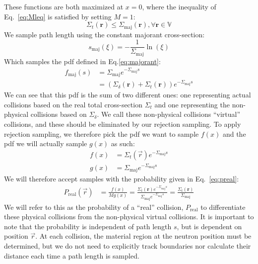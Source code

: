 These functions are both maximized at $x=0$, where the inequality of
Eq.~\eqref{eq:Mleq} is satisfied by setting $M=1$:
\begin{equation}
  \label{eq:cseq}
  \Sigma_t(\mathbf{r}) \leq \Sigma_\mathrm{maj}(\mathbf{r}), \forall
  \mathbf{r} \in \mathbb{V}
\end{equation}
We sample path length using the constant majorant
cross-section:
\begin{equation}
  \label{eq:majorantsample}
  s_\mathrm{maj}(\xi) = -\frac{1}{\Sigma_\mathrm{maj}}\ln(\xi)
\end{equation}
Which samples the \gls{pdf} defined in Eq.\eqref{eq:majorant}:
\begin{align*}
    f_\mathrm{maj}(s) &= \Sigma_\mathrm{maj}e^{-\Sigma_\mathrm{maj}s} \\
  & = (\Sigma_\delta(\mathbf{r}) +
    \Sigma_t(\mathbf{r}))e^{-\Sigma_\mathrm{maj}s}
\end{align*}
We can see that this \gls{pdf} is the sum of two different ones: one
representing actual collisions based on the real total cross-section
$\Sigma_t$ and one representing the non-physical collisions based on
$\Sigma_\delta$. We call these non-physical collisions ``virtual''
collisions, and these should be eliminated by our rejection
sampling. To apply rejection sampling, we therefore pick the \gls{pdf}
we want to sample $f(x)$ and the \gls{pdf} we will actually sample
$g(x)$ as such:
\begin{align*}
  f(x) &= \Sigma_t(\vec{r})e^{-\Sigma_\mathrm{maj}s} \\
  g(x) &= \Sigma_\mathrm{maj}e^{-\Sigma_\mathrm{maj}s}
\end{align*}
We will therefore accept samples with the probability given
in Eq.~\eqref{eq:preal}:
\begin{align}
  \label{eq:prealfinal}
  P_{\mathrm{real}}(\vec{r}) &= \frac{f(x)}{Mg(x)} =
      \frac{\Sigma_t(\mathbf{r})e^{-\Sigma_\mathrm{maj}s}}{\Sigma_\mathrm{maj}e^{-\Sigma_\mathrm{maj}s}}
  = \frac{\Sigma_t(\mathbf{r})}{\Sigma_\mathrm{maj}}
\end{align}
We will refer to this as the probability of a ``real'' collision,
$P_\mathrm{real}$ to differentiate these physical collisions from the
non-physical virtual collisions. It is important to note that the
probability is independent of path length $s$, but is dependent on
position $\vec{r}$. At each collision, the material region at the
neutron position must be determined, but we do not need to explicitly
track boundaries nor calculate their distance each time a path length
is sampled.

